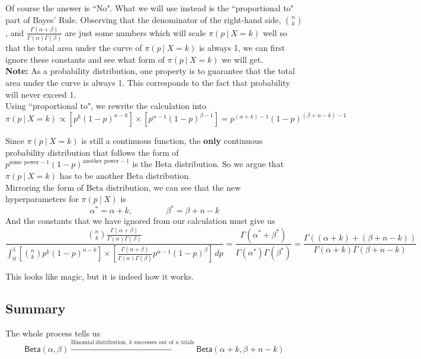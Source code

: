 \documentclass{article}
\def\dsst{\displaystyle}
\begin{document}
Of course the answer is ``No". What we will use instead is the ``proportional to" part of Bayes' Rule. Observing that the denominator of the right-hand side, $\dsst \binom{n}{k}$, and $\dsst \frac{\Gamma(\alpha+\beta)}{\Gamma(\alpha)\Gamma(\beta)}$ are just some numbers which will scale $\pi(p~|~X=k)$ well so that the total area under the curve of $\pi(p~|~X=k)$ is always 1, we can first ignore these constants and see what form of $\pi(p~|~X=k)$ we will get.\\

\textbf{Note:} As a probability distribution, one property is to guarantee that the total area under the curve is always 1. This corresponds to the fact that probability will never exceed 1.\\
 
Using ``proportional to", we rewrite the calculation into
$$ \pi(p~|~X=k) \propto \left[p^k(1-p)^{n-k}\right]\times \left[p^{\alpha-1}(1-p)^{\beta-1}\right] = p^{(\alpha+k)-1}(1-p)^{(\beta+n-k)-1} $$

Since $\pi(p~|~X=k)$ is still a continuous function, the \textbf{only} continuous probability distribution that follows the form of $p^{\text{some power}-1}(1-p)^{\text{another power}-1}$ is the Beta distribution. So we argue that $\pi(p~|~X=k)$ has to be another Beta distribution. \\

Mirroring the form of Beta distribution, we can see that the new hyperparameters for $\pi(p~|~X)$ is 
$$ \alpha^* = \alpha + k,\qquad \qquad \beta^* = \beta + n -k $$
And the constants that we have ignored from our calculation must give us
$$ \frac{\dsst \binom{n}{k}\frac{\Gamma(\alpha+\beta)}{\Gamma(\alpha)\Gamma(\beta)}}{\dsst \int_0^1 \left[\binom{n}{k}p^k(1-p)^{n-k}\right]\times \left[\frac{\Gamma(\alpha+\beta)}{\Gamma(\alpha)\Gamma(\beta)}p^{\alpha-1}(1-p)^{\beta}\right]\, dp} = \frac{\Gamma(\alpha^*+\beta^*)}{\Gamma(\alpha^*)\Gamma(\beta^*)}= \frac{\Gamma((\alpha+k)+(\beta+n-k))}{\Gamma(\alpha+k)\Gamma(\beta+n-k)} $$

This looks like magic, but it is indeed how it works. 

\subsection{Summary}

The whole process tells us
$$ \textsf{Beta}(\alpha, \beta) \xrightarrow{\text{Binomial distribution, $k$ successes out of $n$ trials}} \textsf{Beta}(\alpha+k, \beta+n-k) $$
\end{document}
